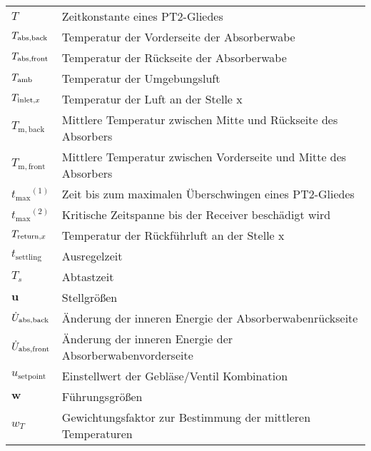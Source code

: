 \begin{longtable}{p{}p{}}
    $T$                              & Zeitkonstante eines PT2-Gliedes                                  \\
    $T_{\mathrm{abs,back}}$                 & Temperatur der Vorderseite der Absorberwabe                      \\
    $T_{\mathrm{abs,front}}$                & Temperatur der Rückseite der Absorberwabe                        \\
    $T_{\mathrm{amb}}$                      & Temperatur der Umgebungsluft                                     \\
    $T_{\mathrm{inlet,}x}$                     & Temperatur der Luft an der Stelle x                              \\
    $T_{\mathrm{m,back}}$            & Mittlere Temperatur zwischen Mitte und Rückseite des Absorbers   \\
    $T_{\mathrm{m,front}}$           & Mittlere Temperatur zwischen Vorderseite und Mitte des Absorbers \\
    ${t_{\mathrm{max}}}^{(1)}$       & Zeit bis zum maximalen Überschwingen eines PT2-Gliedes           \\
    ${t_{\mathrm{max}}}^{(2)}$       & Kritische Zeitspanne bis der Receiver beschädigt wird            \\
    $T_{\mathrm{return,}x}$                    & Temperatur der Rückführluft an der Stelle x                      \\
    $t_{\mathrm{settling}}$          & Ausregelzeit                                                     \\
    $T_s$                            & Abtastzeit                                                       \\
    $\boldsymbol{u}$                 & Stellgrößen                                                      \\
    $\dot{U}_{\mathrm{abs}, \mathrm{back}}$              & Änderung der inneren Energie der Absorberwabenrückseite          \\
    $\dot{U}_{\mathrm{abs}, \mathrm{front}}$             & Änderung der inneren Energie der Absorberwabenvorderseite        \\
    $u_{\mathrm{setpoint}}$          & Einstellwert der Gebläse/Ventil Kombination                      \\
    $\boldsymbol{w}$                 & Führungsgrößen                                                   \\
    $w_T$                            & Gewichtungsfaktor zur Bestimmung der mittleren Temperaturen      \\

\end{longtable}
